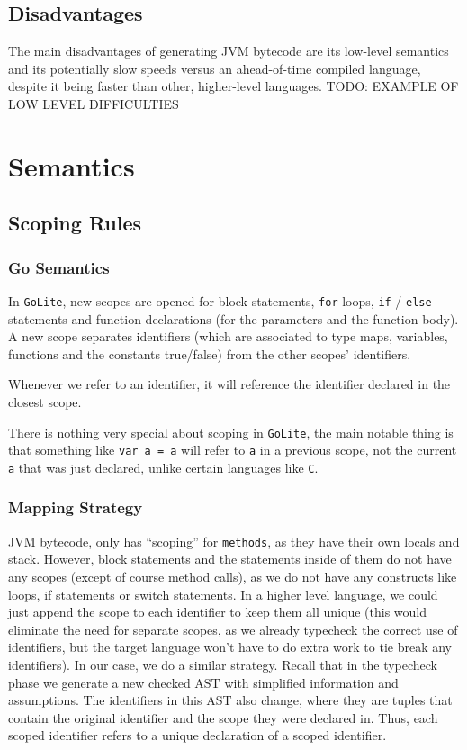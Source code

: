 \documentclass[11pt]{article}
\begin{document}
\subsection{Disadvantages}
\label{sec:orgfedb6a0}
The main disadvantages of generating JVM bytecode are its low-level semantics
and its potentially slow speeds versus an ahead-of-time compiled language,
despite it being faster than other, higher-level languages.
TODO: EXAMPLE OF LOW LEVEL DIFFICULTIES
\section{Semantics}
\label{sec:orgefc63b6}
\subsection{Scoping Rules}
\label{sec:org05ae47b}
\subsubsection{Go Semantics}
\label{sec:orga6887c7}
In \texttt{GoLite}, new scopes are opened for block statements, \texttt{for}
loops, \texttt{if} / \texttt{else} statements and function declarations (for the
parameters and the function body). A new scope separates
identifiers (which are associated to type maps, variables,
functions and the constants true/false) from the other scopes'
identifiers.

Whenever we refer to an identifier, it will reference the
identifier declared in the closest scope.

There is nothing very special about scoping in \texttt{GoLite}, the main
notable thing is that something like \texttt{var a = a} will refer to \texttt{a}
in a previous scope, not the current \texttt{a} that was just declared,
unlike certain languages like \texttt{C}.
\subsubsection{Mapping Strategy}
\label{sec:org4b2da8c}
JVM bytecode, only has ``scoping'' for \texttt{methods}, as they have
their own locals and stack. However, block statements and the
statements inside of them do not have any scopes (except of course
method calls), as we do not have any constructs like loops, if
statements or switch statements. In a higher level language, we
could just append the scope to each identifier to keep them all
unique (this would eliminate the need for separate scopes, as we
already typecheck the correct use of identifiers, but the target
language won't have to do extra work to tie break any
identifiers). In our case, we do a similar strategy. Recall that
in the typecheck phase we generate a new checked AST with
simplified information and assumptions. The identifiers in this
AST also change, where they are tuples that contain the original
identifier and the scope they were declared in. Thus, each scoped
identifier refers to a unique declaration of a scoped identifier.
\end{document}
